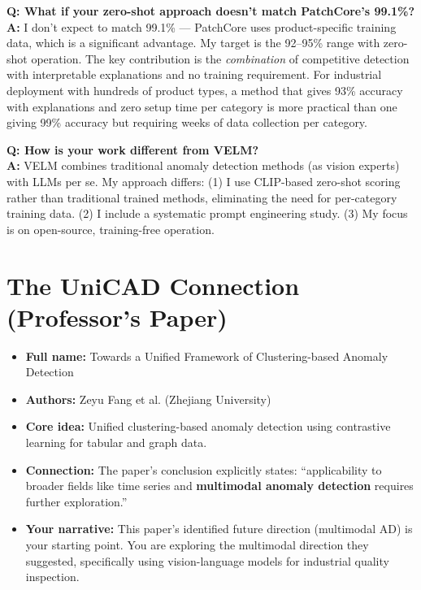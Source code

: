 \documentclass[12pt, a4paper]{article}
\begin{document}
\begin{vivaqa}
\textbf{Q: What if your zero-shot approach doesn't match PatchCore's 99.1\%?}\\[4pt]
\textbf{A:} I don't expect to match 99.1\% --- PatchCore uses product-specific training data, which is a significant advantage. My target is the 92--95\% range with zero-shot operation. The key contribution is the \textit{combination} of competitive detection with interpretable explanations and no training requirement. For industrial deployment with hundreds of product types, a method that gives 93\% accuracy with explanations and zero setup time per category is more practical than one giving 99\% accuracy but requiring weeks of data collection per category.
\end{vivaqa}

\begin{vivaqa}
\textbf{Q: How is your work different from VELM?}\\[4pt]
\textbf{A:} VELM combines traditional anomaly detection methods (as vision experts) with LLMs per se. My approach differs: (1) I use CLIP-based zero-shot scoring rather than traditional trained methods, eliminating the need for per-category training data. (2) I include a systematic prompt engineering study. (3) My focus is on open-source, training-free operation.
\end{vivaqa}



\section{The UniCAD Connection (Professor's Paper)}

\begin{itemize}[leftmargin=*]
    \item \textbf{Full name:} Towards a Unified Framework of Clustering-based Anomaly Detection
    \item \textbf{Authors:} Zeyu Fang et al. (Zhejiang University)
    \item \textbf{Core idea:} Unified clustering-based anomaly detection using contrastive learning for tabular and graph data.
    \item \textbf{Connection:} The paper's conclusion explicitly states: ``applicability to broader fields like time series and \textbf{multimodal anomaly detection} requires further exploration.''
    \item \textbf{Your narrative:} This paper's identified future direction (multimodal AD) is your starting point. You are exploring the multimodal direction they suggested, specifically using vision-language models for industrial quality inspection.
\end{itemize}
\end{document}
